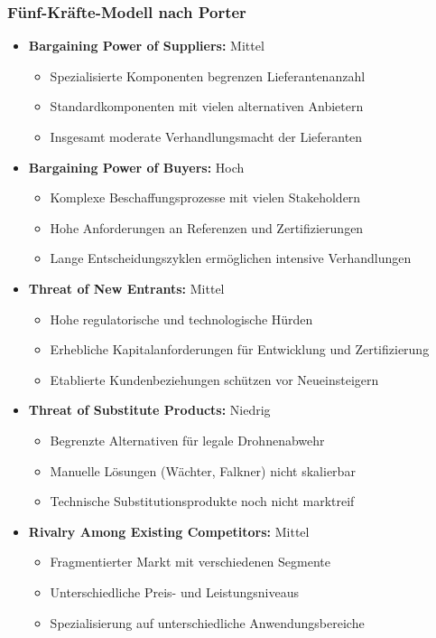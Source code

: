 \documentclass[11pt,a4paper]{article}
\begin{document}
\subsubsection*{Fünf-Kräfte-Modell nach Porter}
\begin{itemize}
\item \textbf{Bargaining Power of Suppliers:} Mittel
\begin{itemize}
\item Spezialisierte Komponenten begrenzen Lieferantenanzahl
\item Standardkomponenten mit vielen alternativen Anbietern
\item Insgesamt moderate Verhandlungsmacht der Lieferanten
\end{itemize}

\item \textbf{Bargaining Power of Buyers:} Hoch
\begin{itemize}
\item Komplexe Beschaffungsprozesse mit vielen Stakeholdern
\item Hohe Anforderungen an Referenzen und Zertifizierungen
\item Lange Entscheidungszyklen ermöglichen intensive Verhandlungen
\end{itemize}

\item \textbf{Threat of New Entrants:} Mittel
\begin{itemize}
\item Hohe regulatorische und technologische Hürden
\item Erhebliche Kapitalanforderungen für Entwicklung und Zertifizierung
\item Etablierte Kundenbeziehungen schützen vor Neueinsteigern
\end{itemize}

\item \textbf{Threat of Substitute Products:} Niedrig
\begin{itemize}
\item Begrenzte Alternativen für legale Drohnenabwehr
\item Manuelle Lösungen (Wächter, Falkner) nicht skalierbar
\item Technische Substitutionsprodukte noch nicht marktreif
\end{itemize}

\item \textbf{Rivalry Among Existing Competitors:} Mittel
\begin{itemize}
\item Fragmentierter Markt mit verschiedenen Segmente
\item Unterschiedliche Preis- und Leistungsniveaus
\item Spezialisierung auf unterschiedliche Anwendungsbereiche
\end{itemize}
\end{itemize}
\end{document}
